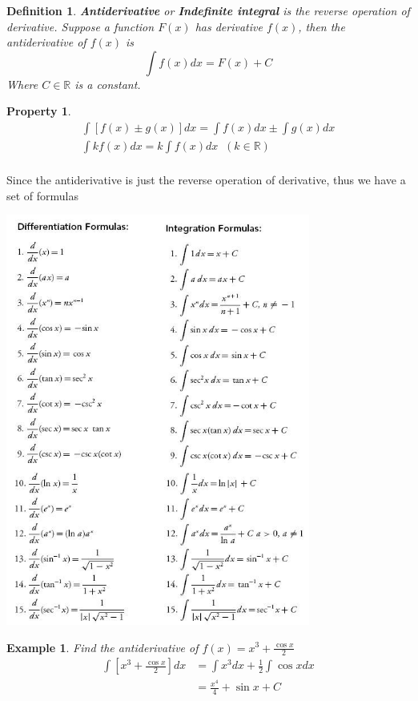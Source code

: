 \documentclass{article}
\newtheorem{definition}{Definition}
\newtheorem{property}{Property}
\newtheorem{ex}{Example}
\begin{document}
\begin{definition}
	\textbf{Antiderivative} or \textbf{Indefinite integral} is the reverse operation of derivative. Suppose a function $F(x)$ has derivative $f(x)$, then the antiderivative of $f(x)$ is 
	\[ \int f(x) dx = F(x) + C \] 
	Where $C\in\mathbb{R}$ is a constant.  
\end{definition}

\begin{property}
	\begin{align}
	\int [f(x)\pm g(x)]dx = \int f(x) dx \pm \int g(x) dx\\
	\int kf(x) dx = k\int f(x) dx\;\; (k\in\mathbb{R})\\
	\end{align}
\end{property}


Since the antiderivative is just the reverse operation of derivative, thus we have a set of formulas
\begin{center}
	\includegraphics*[width=10cm]{rules.jpg}
\end{center}



\begin{ex}
	Find the antiderivative of $f(x)= x^3 + \frac{\cos x}{2}$
	\begin{align*}
	\int [x^3 + \frac{\cos x}{2}]dx &= \int x^3 dx + \frac{1}{2}\int \cos x dx\\
	&= \frac{x^4}{4} + \sin x +C
	\end{align*}
\end{ex}
\end{document}
